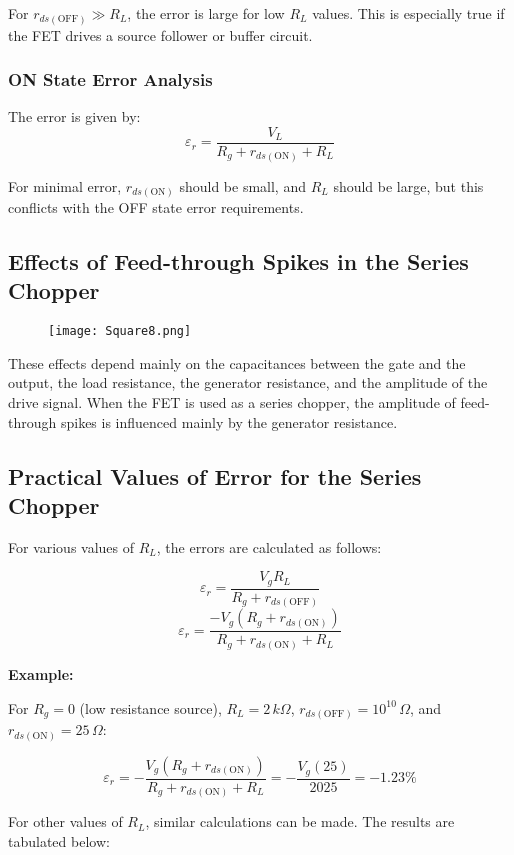 \documentclass[a4paper,9pt,twoside,openany,twocolumn]{memoir}
\begin{document}
For \( r_{ds(\text{OFF})} \gg R_L \), the error is large for low \( R_L \) values. This is especially true if the FET drives a source follower or buffer circuit.

\subsubsection*{ON State Error Analysis}

The error is given by:
\[
\varepsilon_r = \frac{V_L}{R_g + r_{ds(\text{ON})} + R_L}
\]

For minimal error, \( r_{ds(\text{ON})} \) should be small, and \( R_L \) should be large, but this conflicts with the OFF state error requirements.

\subsection*{Effects of Feed-through Spikes in the Series Chopper}
\begin{figure}[h]
    \centering
    \texttt{[image: Square8.png]}
    \caption{}
\end{figure}
These effects depend mainly on the capacitances between the gate and the output, the load resistance, the generator resistance, and the amplitude of the drive signal. When the FET is used as a series chopper, the amplitude of feed-through spikes is influenced mainly by the generator resistance.

\subsection*{Practical Values of Error for the Series Chopper}

For various values of \( R_L \), the errors are calculated as follows:

\[
\varepsilon_r = \frac{V_g R_L}{R_g + r_{ds(\text{OFF})}}
\]
\[
\varepsilon_r = \frac{-V_g (R_g + r_{ds(\text{ON})})}{R_g + r_{ds(\text{ON})} + R_L}
\]

\textbf{Example:}

For \( R_g = 0 \) (low resistance source), \( R_L = 2 \, k\Omega \), \( r_{ds(\text{OFF})} = 10^{10} \, \Omega \), and \( r_{ds(\text{ON})} = 25 \, \Omega \):

\[
\varepsilon_r = -\frac{V_g (R_g + r_{ds(\text{ON})})}{R_g + r_{ds(\text{ON})} + R_L} = -\frac{V_g (25)}{2025} = -1.23\%
\]

For other values of \( R_L \), similar calculations can be made. The results are tabulated below:
\end{document}
